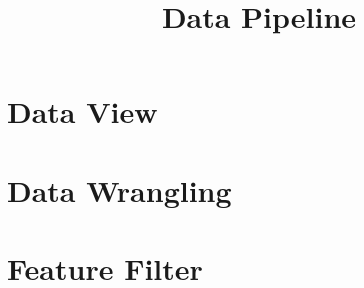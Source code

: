 \documentclass{article}
\title{Data Pipeline}
\begin{document}
\section{Data View}
\section{Data Wrangling}
\section{Feature Filter}
\end{document}
